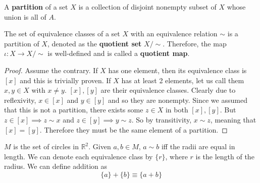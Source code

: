   \begin{definition}[Partition]
    A \textbf{partition} of a set $X$ is a collection of disjoint nonempty subset of $X$ whose union is all of $A$. 
  \end{definition} 

  \begin{theorem}
    \label{partition}
    The set of equivalence classes of a set $X$ with an equivalence relation $\sim$ is a partition of $X$, denoted as the \textbf{quotient set} $X/\sim$. Therefore, the map $\iota: X \rightarrow X/\sim$ is well-defined and is called a \textbf{quotient map}. 
  \end{theorem} 
  \begin{proof}
    Assume the contrary. If $X$ has one element, then its equivalence class is $[x]$ and this is trivially proven. If $X$ has at least 2 elements, let us call them $x, y \in X$ with $x \neq y$. $[x], [y]$ are their equivalence classes. Clearly due to reflexivity, $x \in [x]$ and $y \in [y]$ and so they are nonempty. Since we assumed that this is not a partition, there exists some $z \in X$ in both $[x], [y]$. But $z \in [x] \implies z \sim x$ and $z \in [y] \implies y \sim z$. So by transitivity, $x \sim z$, meaning that $[x] = [y]$. Therefore they must be the same element of a partition. 
  \end{proof}

  \begin{example}[Circles]
    $M$ is the set of circles in $\mathbb{R}^{2}$. Given $a, b \in M$, $a \sim b$ iff the radii are equal in length. We can denote each equivalence class by $\{ r \}$, where $r$ is the length of the radius. We can define addition as 
    \begin{equation}
      \{ a \} + \{ b \} \equiv \{ a + b\}
    \end{equation}
  \end{example}

